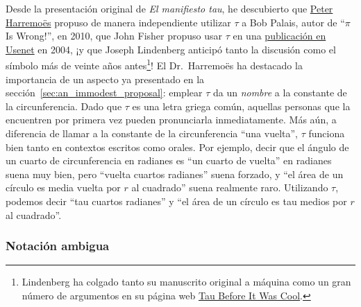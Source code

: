Desde la presentación original de \emph{El manifiesto tau}, he descubierto que \href{http://www.harremoes.dk/Peter/}{Peter Harremo\"{e}s} propuso de manera independiente utilizar $\tau$ a Bob Palais, autor de ``$\pi$ Is Wrong!'', en 2010, que John Fisher propuso usar $\tau$ en una \href{https://groups.google.com/forum/#!msg/sci.math/c-DHmJHSA0A/sLCoOtHB1UAJ}{publicación en Usenet} en 2004, ¡y que Joseph Lindenberg anticipó tanto la discusión como el símbolo más de veinte años antes\footnote{Lindenberg ha colgado tanto su manuscrito original a máquina como un gran número de argumentos en su página web \href{http://sites.google.com/site/taubeforeitwascool/}{Tau Before It Was Cool}.}! El Dr.~Harremo\"{e}s ha destacado la importancia de un aspecto ya presentado en la sección~\ref{sec:an_immodest_proposal}: emplear $\tau$ da un \emph{nombre} a la constante de la circunferencia. Dado que $\tau$ es una letra griega común, aquellas personas que la encuentren por primera vez pueden pronunciarla inmediatamente. Más aún, a diferencia de llamar a la constante de la circunferencia ``una vuelta'',
$\tau$ funciona bien tanto en contextos escritos como orales. Por ejemplo, decir que el ángulo de un cuarto de circunferencia en radianes es ``un cuarto de vuelta'' en radianes suena muy bien, pero ``vuelta cuartos radianes'' suena forzado, y ``el área de un círculo es media vuelta por $r$ al cuadrado'' suena realmente raro. Utilizando $\tau$, podemos decir ``tau cuartos radianes'' y ``el área de un círculo es tau medios por $r$ al cuadrado''.

    \subsubsection{Notación ambigua} %
    \label{sec:ambiguous_notation}

